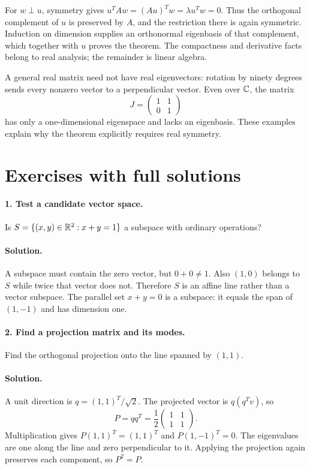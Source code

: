 For $w\perp u$, symmetry gives $u^TAw=(Au)^Tw=\lambda u^Tw=0$.
Thus the orthogonal complement of $u$ is preserved by $A$, and the
restriction there is again symmetric. Induction on dimension supplies an
orthonormal eigenbasis of that complement, which together with $u$ proves
the theorem. The compactness and derivative facts belong to real analysis;
the remainder is linear algebra.

A general real matrix need not have real eigenvectors: rotation by ninety
degrees sends every nonzero vector to a perpendicular vector. Even over
$\mathbb{C}$, the matrix
\[J=\begin{pmatrix}1&1\\0&1\end{pmatrix}\]
has only a one-dimensional eigenspace and lacks an eigenbasis. These examples
explain why the theorem explicitly requires real symmetry.

\section{Exercises with full solutions}
\paragraph{1. Test a candidate vector space.}
Is $S=\{(x,y)\in\mathbb{R}^2:x+y=1\}$ a subspace with ordinary operations?

\paragraph{Solution.}
A subspace must contain the zero vector, but $0+0\ne1$. Also $(1,0)$
belongs to $S$ while twice that vector does not. Therefore $S$ is an affine
line rather than a vector subspace. The parallel set $x+y=0$ is a subspace:
it equals the span of $(1,-1)$ and has dimension one.

\paragraph{2. Find a projection matrix and its modes.}
Find the orthogonal projection onto the line spanned by $(1,1)$.

\paragraph{Solution.}
A unit direction is $q=(1,1)^T/\sqrt2$. The projected vector is
$q(q^Tv)$, so
\[P=qq^T=\frac12\begin{pmatrix}1&1\\1&1\end{pmatrix}.\]
Multiplication gives $P(1,1)^T=(1,1)^T$ and $P(1,-1)^T=0$.
The eigenvalues are one along the line and zero perpendicular to it.
Applying the projection again preserves each component, so $P^2=P$.

